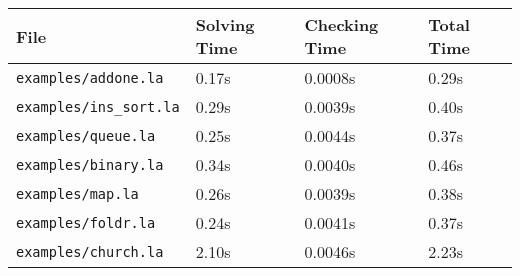 \begin{tabular}{|l|l|l|l|}
\hline
File & {Solving Time} & {Checking Time} & {Total Time}\\
\hline
\texttt{examples/addone.la} & 0.17s & 0.0008s & 0.29s \\
\texttt{examples/ins_sort.la} & 0.29s & 0.0039s & 0.40s \\
\texttt{examples/queue.la} & 0.25s & 0.0044s & 0.37s \\
\texttt{examples/binary.la} & 0.34s & 0.0040s & 0.46s\\
\texttt{examples/map.la} & 0.26s & 0.0039s & 0.38s\\
\texttt{examples/foldr.la} & 0.24s & 0.0041s & 0.37s\\
\texttt{examples/church.la} & 2.10s & 0.0046s & 2.23s\\
\hline
\end{tabular}